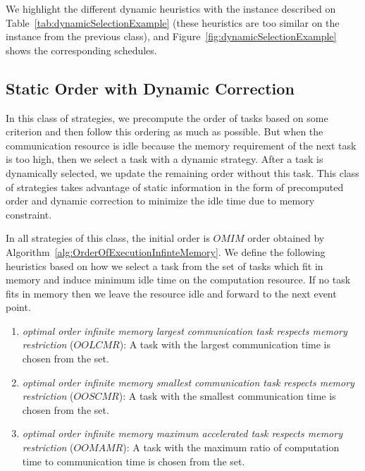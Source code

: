 \documentclass[sigconf]{acmart}
\begin{document}
	We highlight the different dynamic heuristics with the instance described on Table~\ref{tab:dynamicSelectionExample} (these heuristics are too similar on the instance from the previous class), and Figure~\ref{fig:dynamicSelectionExample} shows the corresponding schedules.
	
	\subsection{Static Order with Dynamic Correction}
	
	In this class of strategies, we precompute the order of tasks based on some criterion and then follow this ordering as much as possible. But when the communication resource is idle because the memory requirement of the next task is too high, then we select a task  with a dynamic strategy. After a task is dynamically selected, we update the remaining order without this task. This class of strategies takes advantage of static information in the form of precomputed order and dynamic correction to minimize the idle time due to memory constraint.
	
	In all strategies of this class, the initial order is $OMIM$ order obtained by Algorithm~\ref{alg:OrderOfExecutionInfinteMemory}. We define the following heuristics based on how we select a task from the set of tasks which fit in memory and induce minimum idle time on the computation resource. If no task fits in memory then we leave the resource idle and forward to the next event point.
	
	\begin{enumerate}[label=\roman*)]
		\item \textit{optimal order infinite memory largest communication task respects memory restriction} ($OOLCMR$): A task with the largest communication time is chosen from the set.
		\item \textit{optimal order infinite memory smallest communication task respects memory restriction} ($OOSCMR$): A task with the smallest communication time is chosen from the set.
		\item \textit{optimal order infinite memory maximum accelerated task respects memory restriction} ($OOMAMR$): A task  with the maximum ratio of computation time to communication time is chosen from the set.
	\end{enumerate}
	
\end{document}

